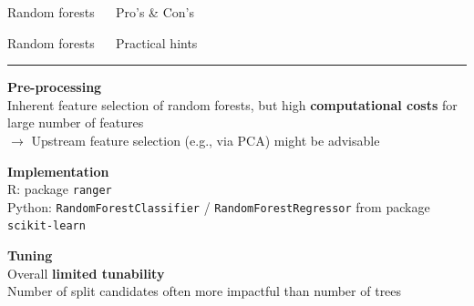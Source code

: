 \documentclass[11pt,compress,t,notes=noshow, xcolor=table]{beamer}
\begin{document}
\begin{frame}{\textcolor{gray!80}{Random forests} ~~ Pro's \& Con's}
\vfill

\small


\end{frame}


\LARGE
\begin{frame}{\textcolor{gray!80}{Random forests} ~~ Practical hints}
\normalsize
\vspace{-0.5cm}
\noindent \textcolor{gray!80}{\rule{\textwidth}{1pt}}

\vspace{0.3cm}

\footnotesize

\textbf{\textcolor{gray!80}{Pre-processing}} \\
\smallskip
Inherent feature selection of random forests, but high \textbf{computational 
costs} for large number of features \\
$\rightarrow$ Upstream feature selection (e.g., via PCA) might be advisable
\lz

\textbf{\textcolor{gray!80}{Implementation}} \\
\smallskip
R: package \texttt{ranger}\\
Python: \texttt{RandomForestClassifier} / \texttt{RandomForestRegressor} from 
package \texttt{scikit-learn}
\lz

\textbf{\textcolor{gray!80}{Tuning}} \\
\smallskip
Overall \textbf{limited tunability} \\
Number of split candidates often more impactful than number of trees

\end{frame}

\end{document}
